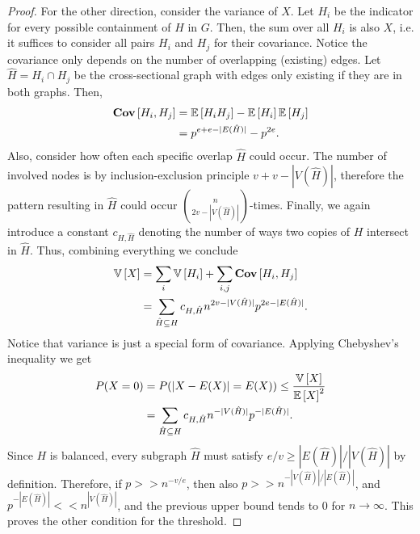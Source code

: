 \begin{aufgabe}
\begin{proof}
		For the other direction, consider the variance of $X$.
		Let $H_i$ be the indicator for every possible containment of $H$ in $G$.
		Then, the sum over all $H_i$ is also $X$, i.e. it suffices to consider all pairs $H_i$ and $H_j$ for their covariance.
		Notice the covariance only depends on the number of overlapping (existing) edges.
		Let $\hat H = H_i \cap H_j$ be the cross-sectional graph with edges only existing if they are in both graphs.
		Then,
		\begin{align*}
			\mathbf{Cov}\left[H_i, H_j\right] & = \mathbb{E}\left[H_iH_j\right] - \mathbb{E}\left[H_i\right]\mathbb{E}\left[H_j\right] \\
			                 & = p^{e+e-|E(\hat H)|} - p^{2e}.
		\end{align*}
		Also, consider how often each specific overlap $\hat H$ could occur.
		The number of involved nodes is by inclusion-exclusion principle $v+v-|V(\hat H)|$,
		therefore the pattern resulting in $\hat H$ could occur $\binom{n}{2v-|V(\hat H)|}$-times.
		Finally, we again introduce a constant $c_{H,\hat H}$ denoting the number of ways two copies of $H$
		intersect in $\hat H$. Thus, combining everything we conclude
		\begin{align}
			\mathbb{V}\left[X\right] & = \sum_i \mathbb{V}\left[H_i\right] + \sum_{i,j} \mathbf{Cov}\left[H_i, H_j\right]                        \\
			             & =\sum_{\hat H \subseteq H} c_{H,\hat H}n^{2v-|V(\hat H)|}p^{2e-|E(\hat H)|}.
		\end{align}
		Notice that variance is just a special form of covariance.
		Applying Chebyshev's inequality we get
		\begin{align*}
			P(X = 0) & = P(|X - E(X)| = E(X) ) \leq \frac{\mathbb{V}\left[X\right]}{\mathbb{E}\left[X\right]^2}            \\
			         & = \sum_{\hat H \subseteq H} c_{H,\hat H}n^{-|V(\hat H)|}p^{-|E(\hat H)|}.
		\end{align*}
		Since $H$ is balanced, every subgraph $\hat H$ must satisfy $e/v \geq |E(\hat H)|/|V(\hat H)|$ by definition.
		Therefore, if $p >> n^{-v/e}$, then also $p >> n^{-|V(\hat H)|/|E(\hat H)|}$,
		and $p^{-|E(\hat H)|} << n^{|V(\hat H)|}$,
		and the previous upper bound tends to 0 for $n \rightarrow \infty$.
		This proves the other condition for the threshold.
	\end{proof}
\end{aufgabe}
